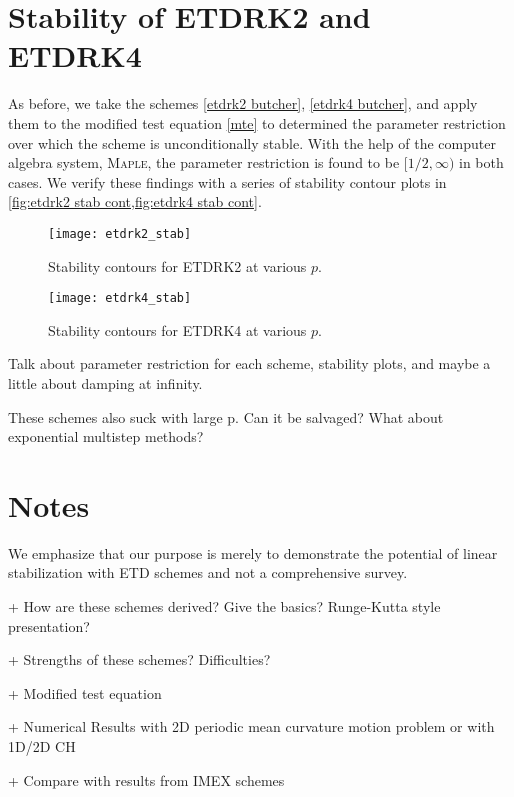 \section{Stability of ETDRK2 and ETDRK4}
As before, we take the schemes \cref{etdrk2 butcher}, \cref{etdrk4 butcher}, and apply them to the modified test equation \cref{mte} to determined the parameter restriction over which the scheme is unconditionally stable. With the help of the computer algebra system, \textsc{Maple}\texttrademark, the parameter restriction is found to be $[1/2,\infty)$ in both cases. We verify these findings with a series of stability contour plots in \cref{fig:etdrk2 stab cont,fig:etdrk4 stab cont}. 

\begin{figure}[htb!]
	\centering
\texttt{[image: etdrk2\_stab]}
\caption{Stability contours for ETDRK2 at various $p$.}
\label{fig:etdrk2 stab cont}
\end{figure}

\begin{figure}[htb!]
	\centering
\texttt{[image: etdrk4\_stab]}
\caption{Stability contours for ETDRK4 at various $p$.}
\label{fig:etdrk4 stab cont}
\end{figure}


Talk about parameter restriction for each scheme, stability plots, and maybe a little about damping at infinity.

These schemes also suck with large p. Can it be salvaged? What about exponential multistep methods? 

\clearpage
\section{Notes}



We emphasize that our purpose is merely to demonstrate the potential of linear stabilization with ETD schemes and not a comprehensive survey.

+ How are these schemes derived? Give the basics? Runge-Kutta style presentation? 

+ Strengths of these schemes? Difficulties? 

+ Modified test equation

+ Numerical Results with 2D periodic mean curvature motion problem or with 1D/2D CH 

+ Compare with results from IMEX schemes
